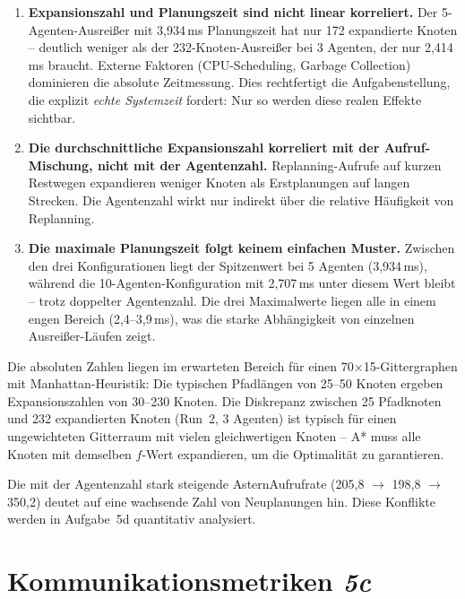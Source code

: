 \begin{enumerate}
    \item \textbf{Expansionszahl und Planungszeit sind nicht linear korreliert.} Der 5-Agenten-Ausreißer mit 3{,}934\,ms Planungszeit hat nur 172 expandierte Knoten -- deutlich weniger als der 232-Knoten-Ausreißer bei 3 Agenten, der nur 2{,}414\,ms braucht. Externe Faktoren (CPU-Scheduling, Garbage Collection) dominieren die absolute Zeitmessung. Dies rechtfertigt die Aufgabenstellung, die explizit \textit{echte Systemzeit} fordert: Nur so werden diese realen Effekte sichtbar.
    \item \textbf{Die durchschnittliche Expansionszahl korreliert mit der Aufruf-Mischung, nicht mit der Agentenzahl.} Replanning-Aufrufe auf kurzen Restwegen expandieren weniger Knoten als Erstplanungen auf langen Strecken. Die Agentenzahl wirkt nur indirekt über die relative Häufigkeit von Replanning.
    \item \textbf{Die maximale Planungszeit folgt keinem einfachen Muster.} Zwischen den drei Konfigurationen liegt der Spitzenwert bei 5 Agenten (3{,}934\,ms), während die 10-Agenten-Konfiguration mit 2{,}707\,ms unter diesem Wert bleibt -- trotz doppelter Agentenzahl. Die drei Maximalwerte liegen alle in einem engen Bereich (2{,}4--3{,}9\,ms), was die starke Abhängigkeit von einzelnen Ausreißer-Läufen zeigt.
\end{enumerate}

Die absoluten Zahlen liegen im erwarteten Bereich für einen 70$\times$15-Gittergraphen mit Manhattan-Heuristik: Die typischen Pfadlängen von 25--50 Knoten ergeben Expansionszahlen von 30--230 Knoten. Die Diskrepanz zwischen 25 Pfadknoten und 232 expandierten Knoten (Run~2, 3 Agenten) ist typisch für einen ungewichteten Gitterraum mit vielen gleichwertigen Knoten -- A* muss alle Knoten mit demselben \(f\)-Wert expandieren, um die Optimalität zu garantieren.

Die mit der Agentenzahl stark steigende \acs{Astern}Aufrufrate (205{,}8 $\to$ 198{,}8 $\to$ 350{,}2) deutet auf eine wachsende Zahl von Neuplanungen hin. Diese Konflikte werden in Aufgabe~5d quantitativ analysiert.


\section{Kommunikationsmetriken \textit{5c}}
\label{sec:aufgabe5c}

